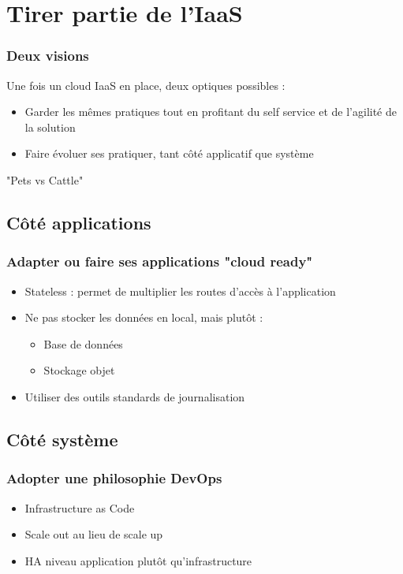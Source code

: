   \section{Tirer partie de l'IaaS}

  \begin{frame}
    \frametitle{Deux visions}
    Une fois un cloud IaaS en place, deux optiques possibles :
    \begin{itemize}
      \item Garder les mêmes pratiques tout en profitant du self service et de l'agilité de la solution
      \item Faire évoluer ses pratiquer, tant côté applicatif que système
    \end{itemize}
    "Pets vs Cattle"
  \end{frame}

  \subsection{Côté applications}

  \begin{frame}
    \frametitle{Adapter ou faire ses applications "cloud ready"}
    \begin{itemize}
      \item Stateless : permet de multiplier les routes d'accès à l'application
      \item Ne pas stocker les données en local, mais plutôt :
      \begin{itemize}
        \item Base de données
        \item Stockage objet
      \end{itemize}
    \item Utiliser des outils standards de journalisation
    \end{itemize}
  \end{frame}

  \subsection{Côté système}

  \begin{frame}
    \frametitle{Adopter une philosophie DevOps}
    \begin{itemize}
      \item Infrastructure as Code
      \item Scale out au lieu de scale up
      \item HA niveau application plutôt qu'infrastructure
    \end{itemize}
  \end{frame}

